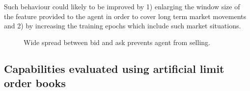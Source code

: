 Such behaviour could likely to be improved by 1) enlarging the window size of the feature provided to the agent in order to cover long term market movements and 2) by increasing the training epochs which include such market situations.
\begin{figure}[H]
    \centering
    \caption{Wide spread between bid and ask prevents agent from selling.}
    \label{fig:analysis-limit-impatient}
\end{figure}

\subsection{Capabilities evaluated using artificial limit order books}

